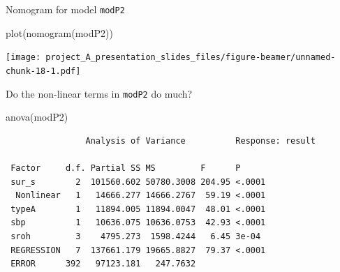 \documentclass[
  ignorenonframetext,
]{beamer}
\newenvironment{Shaded}{\begin{snugshade}}{\end{snugshade}}
\newcommand{\FunctionTok}[1]{\textcolor[rgb]{0.00,0.00,0.00}{#1}}
\newcommand{\NormalTok}[1]{#1}
\begin{document}
\begin{frame}[fragile]{Nomogram for model \texttt{modP2}}
\protect\hypertarget{nomogram-for-model-modp2}{}
\begin{Shaded}
\begin{Highlighting}[]
\FunctionTok{plot}\NormalTok{(}\FunctionTok{nomogram}\NormalTok{(modP2))}
\end{Highlighting}
\end{Shaded}

\texttt{[image: project\_A\_presentation\_slides\_files/figure-beamer/unnamed-chunk-18-1.pdf]}
\end{frame}

\begin{frame}[fragile]{Do the non-linear terms in \texttt{modP2} do
much?}
\protect\hypertarget{do-the-non-linear-terms-in-modp2-do-much}{}
\begin{Shaded}
\begin{Highlighting}[]
\FunctionTok{anova}\NormalTok{(modP2)}
\end{Highlighting}
\end{Shaded}

\begin{verbatim}
                Analysis of Variance          Response: result 

 Factor     d.f. Partial SS MS         F      P     
 sur_s        2  101560.602 50780.3008 204.95 <.0001
  Nonlinear   1   14666.277 14666.2767  59.19 <.0001
 typeA        1   11894.005 11894.0047  48.01 <.0001
 sbp          1   10636.075 10636.0753  42.93 <.0001
 sroh         3    4795.273  1598.4244   6.45 3e-04 
 REGRESSION   7  137661.179 19665.8827  79.37 <.0001
 ERROR      392   97123.181   247.7632              
\end{verbatim}
\end{frame}
\end{document}
